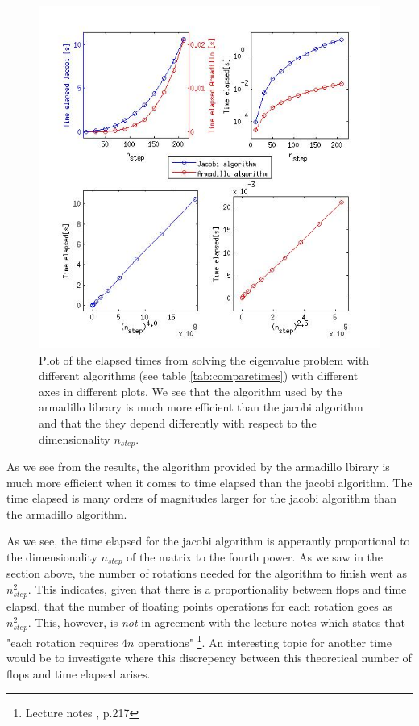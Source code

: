 \documentclass[a4paper,10pt,english]{article}
\numberwithin{figure}{subsection}
\numberwithin{table}{subsection}
\numberwithin{equation}{subsection}
\begin{document}
\begin{figure}[h!]
  \centering 
  \includegraphics[width=\textwidth]{compare_times_arma_jacobi.jpg}
  \caption{Plot of the elapsed times from solving the eigenvalue problem with 
            different algorithms (see table \ref{tab:comparetimes})
            with different axes in different plots.
            We see that the algorithm used by the armadillo library is much more efficient 
            than the jacobi algorithm
            and that the they depend differently with respect to the 
            dimensionality $n_{step}$. }
  \label{fig:comparetimes}
\end{figure}

As we see from the results, the algorithm provided by the armadillo lbirary is much more 
efficient when it comes to time elapsed than the jacobi algorithm.
The time elapsed is many orders of magnitudes larger for the jacobi algorithm than the 
armadillo algorithm.

As we see, the time elapsed for the jacobi algorithm is apperantly proportional
to the dimensionality $n_{step}$ of the matrix to the fourth power. 
As we saw in the section above, the number of rotations needed for the algorithm to 
finish went as $n_{step}^2$. 
This indicates, given that there is a proportionality between flops and time elapsd, 
that the number of floating points operations for each rotation goes as $n_{step}^2$. 
This, however, is \textit{not} in agreement with the lecture notes which 
states that 
"each rotation requires $4n$ operations" 
\footnote{Lecture notes \cite{lecturenotes}, p.217}.
An interesting topic for another time would be to investigate where this 
discrepency between this theoretical number of flops and time elapsed arises.
\end{document}
